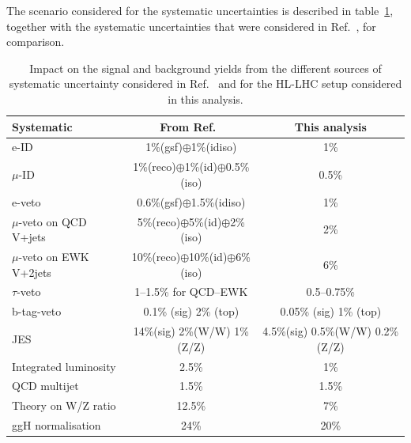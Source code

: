 \documentclass[../report.tex]{subfiles}
\begin{document}
The scenario considered for the systematic uncertainties is described
in table~\ref{tab:systs}, together with the systematic uncertainties that were 
considered in Ref.~\cite{Sirunyan:2018owy}, for comparison.

\begin{table}[ht]
  \centering
  {%
  \begin{tabular}{l|c|c}
    \hline
    Systematic & From Ref.~\cite{Sirunyan:2018owy} & This analysis \\
    \hline
    e-ID & 1\%(gsf)$\oplus$1\%(idiso) & 1\% \\
    $\mu$-ID & 1\%(reco)$\oplus$1\%(id)$\oplus$0.5\%(iso) & 0.5\% \\
    \hline
    e-veto & 0.6\%(gsf)$\oplus$1.5\%(idiso) & 1\% \\
    $\mu$-veto on QCD V+jets & 5\%(reco)$\oplus$5\%(id)$\oplus$2\%(iso) & 2\% \\
    $\mu$-veto on EWK V+2jets & 10\%(reco)$\oplus$10\%(id)$\oplus$6\%(iso) & 6\% \\
    $\tau$-veto & 1--1.5\% for QCD--EWK  & 0.5--0.75\% \\
    b-tag-veto & 0.1\% (sig) 2\% (top) & 0.05\% (sig) 1\% (top) \\
    \hline
    JES & 14\%(sig) 2\%(W/W) 1\%(Z/Z) & 4.5\%(sig) 0.5\%(W/W) 0.2\%(Z/Z) \\
    Integrated luminosity & 2.5\% & 1\% \\
    QCD multijet & 1.5\%  & 1.5\% \\
    \hline
    Theory on W/Z ratio & 12.5\% & 7\% \\
    ggH normalisation & 24\% & 20\% \\
    \hline
\end{tabular}
    } \caption{Impact on the signal and background yields from the
    different sources of systematic uncertainty considered in
    Ref.~\cite{Sirunyan:2018owy} and for the HL-LHC setup considered
    in this analysis.}  \label{tab:systs}
\end{table}
\end{document}
